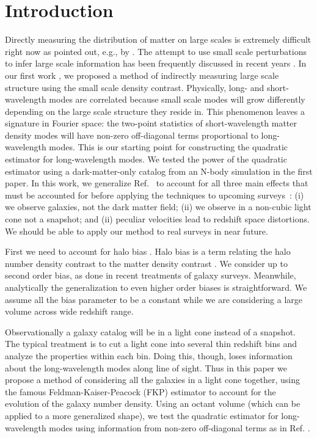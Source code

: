 \documentclass[prd,amsmath,amssymb,floatfix,superscriptaddress,nofootinbib,twocolumn]{revtex4-1}
\begin{document}
\section{Introduction} \label{sec1}
\noindent Directly measuring the distribution of matter on large scales is extremely difficult right now as pointed out, e.g., by \cite{Modi:2019hydr}. The attempt to use small scale perturbations to infer large scale information has been frequently discussed in recent years \cite{Baldauf:2011fer}\cite{Jeong:2012foss}\cite{Li:2014ssc}\cite{Zhu:2016tidal}\cite{Barreira:2017res}. In our first work \cite{Li:2020fir}, we proposed a method of indirectly measuring large scale structure using the small scale density contrast. Physically, long- and short-wavelength modes are correlated because small scale modes will grow differently depending on the large scale structure they reside in. This phenomenon leaves a signature in Fourier space: the two-point statistics of short-wavelength matter density modes will have non-zero off-diagonal terms proportional to long-wavelength modes. This is our starting point for constructing the quadratic estimator for long-wavelength modes. We tested the power of the quadratic estimator using a dark-matter-only catalog from an N-body simulation in the first paper. In this work, we generalize Ref.~\cite{Li:2020fir} to account for all three main effects that must be accounted for before applying the techniques to upcoming surveys~\cite{LSST:2012ls}\cite{Wfirst:2012jg}\cite{DESI:2019ds}: (i) we observe galaxies, not the dark matter field; (ii) we observe in a non-cubic light cone not a snapshot; and (ii) peculiar velocities lead to redshift space distortions. We should be able to apply our method to real surveys in near future.

First we need to account for halo bias \cite{Kravtsov:1999hb}\cite{Desjacques:2018rev}. Halo bias is a term relating the halo number density contrast to the matter density contrast \cite{Gil-Marin:2014sta}\cite{Gil-Marin:2016wya}. We consider up to second order bias, as done in recent treatments of galaxy surveys. Meanwhile, analytically the generalization to even higher order biases is straightforward. We assume all the bias parameter to be a constant while we are considering a large volume across wide redshift range.

Observationally a galaxy catalog will be in a light cone \cite{Carroll:1997gr} instead of a snapshot. The typical  treatment is to cut a light cone into several thin redshift bins \cite{Chuang:2016uuz} and analyze the properties within each bin. Doing this, though, loses information about the long-wavelength modes along line of sight. Thus in this paper we propose a method of considering all the galaxies in a light cone together, using the famous Feldman-Kaiser-Peacock (FKP) estimator \cite{Feldman:1993ky} to account for the evolution of the galaxy number density. Using an octant volume (which can be applied to a more generalized shape), we test the quadratic estimator for long-wavelength modes using information from non-zero off-diagonal terms as in Ref. \cite{Li:2020fir}.
\end{document}
